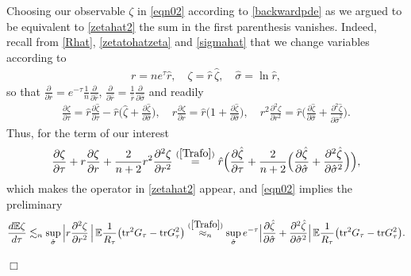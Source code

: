 \documentclass[english, letterpaper,12pt,reqno]{amsart}
\theoremstyle{remark}
\renewenvironment{proof}[1][Proof]{ {\itshape \noindent {#1.}} }{$\Box$
\medskip}
\theoremstyle{plain}
\newcommand{\1}{\mathbf{1}}
\newcommand{\E}{\mathbb{E}}
\def\tr{{\rm tr}}
\begin{document}
\begin{proof}[Proof of Lemma~\ref{lem:zeta}]
\noindent
Choosing our observable $ \zeta $ in \eqref{eqn02} according to \eqref{backwardpde} as we argued to be equivalent to \eqref{zetahat2} the sum in the first parenthesis vanishes. Indeed, recall from \eqref{Rhat}, \eqref{zetatohatzeta} and \eqref{sigmahat} that we change variables according to
%
\begin{align*}
	r = n e^{ \tau } \hat r ,
	\quad \zeta = \hat r \, \hat \zeta ,
	\quad \hat \sigma = \ln \hat r ,
\end{align*}
%
so that $ \frac{ \partial }{ \partial r } = e^{ - \tau } \frac{ 1 }{ n } \frac{ \partial }{ \partial \hat r }  $, $ \frac{ \partial }{ \partial \hat r } = \frac{ 1 }{ \hat r } \frac{ \partial }{ \partial \hat\sigma } $ and readily
%
\begin{align}\label{Trafo}
	\frac{ \partial \zeta }{ \partial \tau } = \hat r \frac{ \partial \hat \zeta }{ \partial \tau } - \hat r \Big( \hat \zeta + \frac{ \partial \hat \zeta }{ \partial \hat \sigma } \Big)  ,
	\quad r \frac{ \partial \zeta }{ \partial r } = \hat r \Big( 1 + \frac{ \partial  \hat \zeta }{ \partial \hat\sigma } \Big) , 
	\quad  r^2 \frac{ \partial^2 \zeta }{ \partial r ^2} = \hat r \Big( \frac{ \partial \hat \zeta }{ \partial \hat\sigma } + \frac{ \partial^2 \hat \zeta }{ \partial \hat\sigma^2 } \Big) .
\end{align}
%
Thus, for the term of our interest
%
\begin{align*}
	\frac{ \partial \zeta }{ \partial \tau } + r \frac{ \partial \zeta }{ \partial r }  + \frac{ 2 }{ n + 2 } r^2\frac{ \partial^2 \zeta }{ \partial r^2 }
	\stackrel{(\ref{Trafo})}{ = } \hat r \Big( \frac{ \partial \hat \zeta }{ \partial \tau } + \frac{ 2 }{ n + 2 } \Big( \frac{ \partial \hat \zeta }{ \partial \hat\sigma } + \frac{ \partial^2 \hat\zeta }{ \partial \hat\sigma^2 } \Big) \Big) ,
\end{align*}
%
which makes the operator in \eqref{zetahat2} appear, and \eqref{eqn02} implies the preliminary
%
\begin{align}\label{eqn01}
	\frac{d  \E \zeta }{ d \tau }
	\lesssim_n \sup_{ \hat \sigma } \Big| r \frac{ \partial^2 \zeta }{ \partial r^2 } \, \Big|
	\, \E \frac{ 1 }{ R_\tau } \big( \tr^2 G_{ \tau } - \tr G_{ \tau }^2 \big)  
	\stackrel{ (\ref{Trafo}) }{ \approx_n } \sup_{ \hat \sigma } e^{ - \tau } \Big| \frac{ \partial \hat \zeta }{ \partial \hat\sigma } + \frac{ \partial^2 \hat \zeta }{ \partial \hat\sigma^2 }
	 \Big|
	\, \E \frac{ 1 }{ R_{ \tau } } \big( \tr^2 G_{ \tau } - \tr G_{ \tau }^2 \big)  .
\end{align}

\end{proof}
\end{document}
